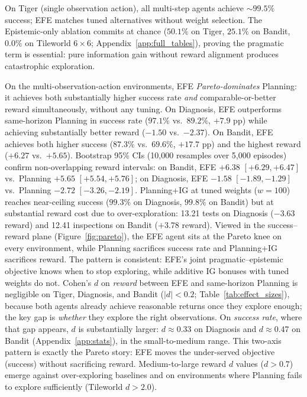 \documentclass[runningheads]{llncs}
\begin{document}
On Tiger (single observation action), all multi-step agents achieve ${\sim}99.5\%$ success; EFE matches tuned alternatives without weight selection. The Epistemic-only ablation commits at chance ($50.1\%$ on Tiger, $25.1\%$ on Bandit, $0.0\%$ on Tileworld $6{\times}6$; Appendix~\ref{app:full_tables}), proving the pragmatic term is essential: pure information gain without reward alignment produces catastrophic exploration.

On the multi-observation-action environments, EFE \emph{Pareto-dominates} Planning: it achieves both substantially higher success rate \emph{and} comparable-or-better reward simultaneously, without any tuning. On Diagnosis, EFE outperforms same-horizon Planning in success rate ($97.1\%$ vs.\ $89.2\%$, $+7.9$ pp) while achieving substantially better reward ($-1.50$ vs.\ $-2.37$). On Bandit, EFE achieves both higher success ($87.3\%$ vs.\ $69.6\%$, $+17.7$ pp) and the highest reward ($+6.27$ vs.\ $+5.65$). Bootstrap 95\% CIs (10{,}000 resamples over 5{,}000 episodes) confirm non-overlapping reward intervals: on Bandit, EFE $+6.38$ $[+6.29, +6.47]$ vs.\ Planning $+5.65$ $[+5.54, +5.76]$; on Diagnosis, EFE $-1.58$ $[-1.89, -1.29]$ vs.\ Planning $-2.72$ $[-3.26, -2.19]$. Planning+IG at tuned weights ($w{=}100$) reaches near-ceiling success ($99.3\%$ on Diagnosis, $99.8\%$ on Bandit) but at substantial reward cost due to over-exploration: 13.21 tests on Diagnosis ($-3.63$ reward) and 12.41 inspections on Bandit ($+3.78$ reward). Viewed in the success--reward plane (Figure~\ref{fig:pareto}), the EFE agent sits at the Pareto knee on every environment, while Planning sacrifices success rate and Planning+IG sacrifices reward. The pattern is consistent: EFE's joint pragmatic--epistemic objective knows when to stop exploring, while additive IG bonuses with tuned weights do not. Cohen's $d$ on \emph{reward} between EFE and same-horizon Planning is negligible on Tiger, Diagnosis, and Bandit ($|d| < 0.2$; Table~\ref{tab:effect_sizes}), because both agents already achieve reasonable returns once they explore enough; the key gap is \emph{whether} they explore the right observations. On \emph{success rate}, where that gap appears, $d$ is substantially larger: $d \approx 0.33$ on Diagnosis and $d \approx 0.47$ on Bandit (Appendix~\ref{app:stats}), in the small-to-medium range. This two-axis pattern is exactly the Pareto story: EFE moves the under-served objective (success) without sacrificing reward. Medium-to-large reward $d$ values ($d > 0.7$) emerge against over-exploring baselines and on environments where Planning fails to explore sufficiently (Tileworld $d > 2.0$).
\end{document}
